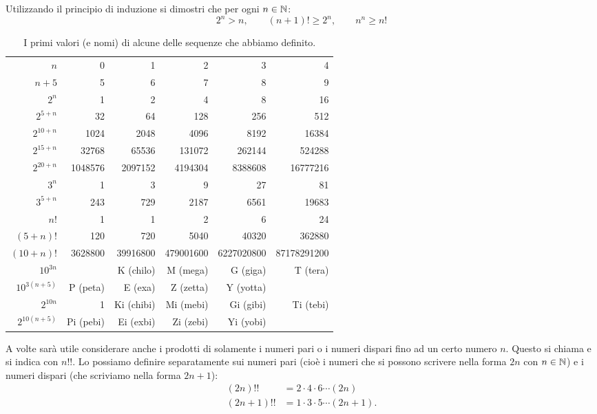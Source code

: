 \begin{exercise}
  \label{ex:6734098}%
  Utilizzando il principio di induzione
  si dimostri che per ogni $n\in {\mathbb N}$:
  \[
    2^n > n, \qquad 
    (n+1)! \ge 2^n, \qquad
    n^n \ge n!
  \]
\end{exercise}

\begin{table}
  \begin{center}
  \begin{tabular}{r|>{\small}r>{\small}r>{\small}r>{\small}r>{\small}r}
  $n$       & 0 & 1 & 2 & 3 & 4 \\
  \footnotesize $n+5$     & 5 & 6 & 7 & 8 & 9 \\ \hline
  $2^n$     & 1 & 2 & 4 & 8 & 16 \\
  \footnotesize $2^{5+n}$ & 32 & 64 & 128 & 256 & 512 \\
  \footnotesize $2^{10+n}$ & 1024 & 2048 & 4096 & 8192 & 16384 \\
  \footnotesize $2^{15+n}$ & 32768 & 65536 & 131072 & 262144 & 524288 \\
  \footnotesize $2^{20+n}$ & 1048576 & 2097152 & 4194304 & 8388608 & 16777216 \\  \hline
  $3^n$                    & 1 & 3 & 9 & 27 & 81 \\
  \footnotesize $3^{5+n}$  & 243 & 729 & 2187 & 6561 & 19683 \\  \hline
  $n!$      & 1 & 1 & 2 & 6 & 24 \\
  \footnotesize $(5+n)!$  & 120 & 720 & 5040 & 40320 & 362880 \\
  \footnotesize $(10+n)!$  & 3628800 & 39916800 & 479001600 & 6227020800 & 87178291200 \\ \hline
  \footnotesize $10^{3n}$  &  & K (chilo) & M (mega) & G (giga) & T (tera) \\ 
  \footnotesize $10^{3(n+5)}$  & P (peta) & E (exa) & Z (zetta) & Y (yotta) \\ \hline
  \footnotesize $2^{10n}$  & 1 & Ki (chibi) & Mi (mebi) & Gi (gibi) & Ti (tebi) \\
  \footnotesize $2^{10(n+5)}$ & Pi (pebi)& Ei (exbi) & Zi (zebi) & Yi (yobi)
  \end{tabular}
  \end{center}
  \caption{I primi valori (e nomi) di alcune delle sequenze che abbiamo definito.}
  \end{table}
  
  A volte sarà utile considerare anche i prodotti di solamente i numeri
  pari o i numeri dispari fino ad un certo numero $n$. Questo
  si chiama  e si indica con $n!!$. 
  Lo possiamo definire separatamente sui numeri pari (cioè 
  i numeri che si possono scrivere nella forma $2n$ con $n\in {\mathbb N}$)
  e i numeri dispari (che scriviamo nella forma $2n+1$):
  \begin{align*}
    (2n)!! &= 2 \cdot 4 \cdot 6 \cdots (2n) \\
    (2n+1)!! &= 1 \cdot 3 \cdot 5 \cdots (2n+1).
  \end{align*}
  
